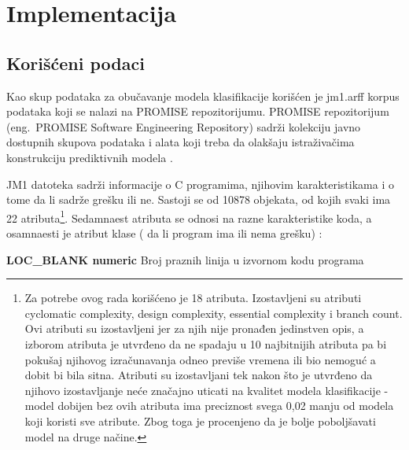 \documentclass[12pt,oneside]{memoir}
\begin{document}



\chapter{Implementacija}

\section{Korišćeni podaci}
\label{kor_podaci}




Kao skup podataka za obučavanje modela klasifikacije korišćen je jm1.arff korpus podataka koji se nalazi na PROMISE repozitorijumu. PROMISE repozitorijum (eng.~PROMISE Software Engineering Repository) sadrži kolekciju javno dostupnih skupova podataka i alata koji treba da olakšaju istraživačima konstrukciju prediktivnih modela \cite{promise}. 

JM1 datoteka sadrži informacije o C programima, njihovim karakteristikama i o tome da li sadrže grešku ili ne. Sastoji se od 10878 objekata, od kojih svaki ima 22 atributa\footnote{Za potrebe ovog rada korišćeno je 18 atributa.  Izostavljeni su atributi cyclomatic complexity, design complexity, essential complexity i branch count. Ovi atributi su izostavljeni jer za njih nije pronađen jedinstven opis, a izborom atributa je utvrđeno da ne spadaju u 10 najbitnijih atributa pa bi pokušaj njihovog izračunavanja odneo previše vremena ili bio nemoguć a dobit bi bila sitna. Atributi su izostavljani tek nakon što je utvrđeno da njihovo izostavljanje neće značajno uticati na kvalitet modela klasifikacije - model dobijen bez ovih atributa ima preciznost svega 0,02 manju od modela koji koristi sve atribute. Zbog toga je procenjeno da je bolje poboljšavati model na druge načine. }. Sedamnaest atributa se odnosi na razne karakteristike koda, a osamnaesti je atribut klase ( da li program ima ili nema grešku) \cite{jm1}: 

\textbf{LOC\_BLANK numeric } Broj praznih linija u izvornom kodu programa
\end{document}
